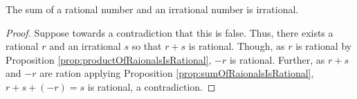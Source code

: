 \guard





\begin{prop}
\label{prop:sumOfRationalAndIrrationalIsIrrational}
  The sum of a rational number and an irrational number is irrational.
\end{prop}
\begin{proof}
  Suppose towards a contradiction that this is false.
  Thus, there exists a rational $r$ and an irrational $s$ so that $r+s$ is rational.
  Though, as $r$ is rational by Proposition \ref{prop:productOfRaionalsIsRational}, $-r$ is rational.
  Further, as $r+s$ and $-r$ are ration applying Proposition \ref{prop:sumOfRaionalsIsRational}, $r+s+(-r)=s$ is rational, a contradiction.
\end{proof}
